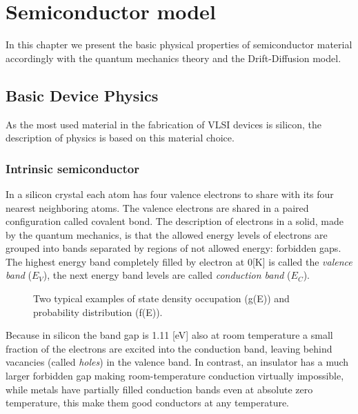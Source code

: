 \chapter{Semiconductor model}

In this chapter we present the basic physical properties of semiconductor material accordingly with the quantum mechanics theory \citep{ModernVLSIdevices} and the Drift-Diffusion model.

\section{Basic Device Physics}

As the most used material in the fabrication of VLSI devices is silicon, the description of physics is based on this material choice.

\subsection{Intrinsic semiconductor}
In a silicon crystal each atom has four valence electrons to share with its four nearest neighboring atoms. The valence electrons are shared in a paired configuration called covalent bond.  The description of electrons in a solid, made by the quantum mechanics, is that the allowed energy levels of electrons are grouped into bands separated by regions of not allowed energy: forbidden gaps. The highest energy band completely filled by electron at 0[K] is called the \textit{valence band} ($E_V$), the next energy band levels are called \textit{conduction band} ($E_C$).

\begin{figure}[!h]
\centering
{}
\caption{Two typical examples of state density occupation (g(E)) and probability distribution (f(E)).  }
\end{figure}

Because in silicon the band gap is 1.11 [eV] \cite{SolidState} also at room temperature a small fraction of the electrons are excited into the conduction band, leaving behind vacancies (called \textit{holes}) in the valence band.
In contrast, an insulator has a much larger forbidden gap making room-temperature conduction virtually impossible, while metals have partially filled conduction bands even at absolute zero temperature, this make them good conductors at any temperature. 

